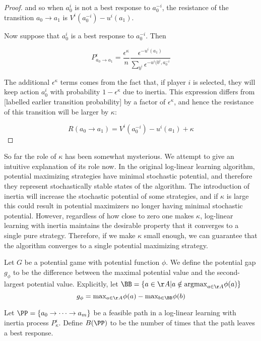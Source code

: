 \begin{proof}
and so when $a^i_0$ is not a best response to $a^{-i}_0$, the resistance of the transition $a_0 \rightarrow a_1$ is $V^i(a_0^{-i}) - u^i(a_1)$.

Now suppose that $a^i_0$ is a best response to $a^{-i}_0$. Then

$$
P^{\epsilon}_{a_0 \rightarrow a_1} = \dfrac{\epsilon^{\kappa}}{n} \dfrac{\epsilon^{-u^i(a_1)}}{\sum_{b^i} \epsilon^{-u^i(b^i, a^{-i}_0}}
$$

The additional $\epsilon^{\kappa}$ terms comes from the fact that, if player $i$ is selected, they will keep action $a^i_0$ with probability $1-\epsilon^{\kappa}$ due to inertia. This expression differs from [labelled earlier transition probability] by a factor of $\epsilon^{\kappa}$, and hence the resistance of this transition will be larger by $\kappa$:

$$
R(a_0 \rightarrow a_1) = V^i(a_0^{-i}) - u^i(a_1) + \kappa
$$
\end{proof}

So far the role of $\kappa$ has been somewhat mysterious. We attempt to give an intuitive explanation of its role now. In the original log-linear learning algorithm, potential maximizing strategies have minimal stochastic potential, and therefore they represent stochastically stable states of the algorithm. The introduction of inertia will increase the stochastic potential of some strategies, and if $\kappa$ is large this could result in potential maximizers no longer having minimal stochastic potential. However, regardless of how close to zero one makes $\kappa$, log-linear learning with inertia maintains the desirable property that it converges to a single pure strategy. Therefore, if we make $\kappa$ small enough, we can guarantee that the algorithm converges to a single potential maximizing strategy.


\begin{mydef}
Let $G$ be a potential game with potential function $\phi$. We define the potential gap $g_{\phi}$ to be the difference between the maximal potential value and the second-largest potential value. Explicitly, let $\BB = \{a \in \AA | a \notin \text{argmax}_{a \in \AA} \phi(a)  \}$
$$
g_{\phi} = \text{max}_{a \in \AA} \phi(a) - \text{max}_{b \in \BB} \phi(b)
$$
\end{mydef}


\begin{mydef}
Let $\PP = \{a_0 \rightarrow \cdots \rightarrow a_m\}$ be a feasible path in a log-linear learning with inertia process $P_{\kappa}^{\epsilon}$. Define $B(\PP)$ to be the number of times that the path leaves a best response.
\end{mydef}





